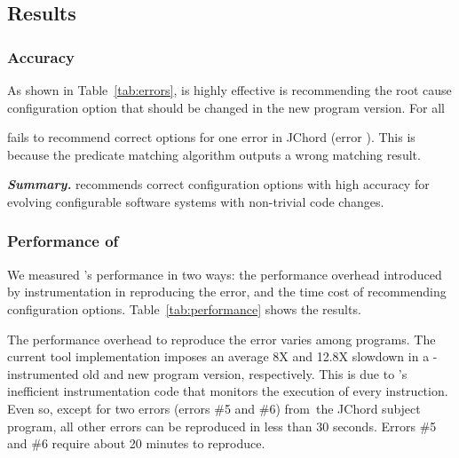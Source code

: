 \subsection{Results}

\subsubsection{Accuracy}
\label{sec:accuracy}

As shown in Table~\ref{tab:errors}, \ourtool is highly effective
is recommending the root cause configuration option that should
be changed in the new program version. For all 


\ourtool fails to recommend correct options for one error in
JChord (error ). This is because the predicate matching
algorithm outputs a wrong matching result.


\vspace{1mm}

\noindent \textbf{\textit{Summary.}} \ourtool
recommends correct configuration options with
high accuracy for evolving configurable software systems
with non-trivial code changes.

\subsubsection{Performance of \ourtool}
\label{sec:timecost}

We measured \ourtool's performance in two ways:
the performance overhead introduced by instrumentation
in reproducing the error, and the time cost
of recommending configuration options.
Table~\ref{tab:performance} shows the results.

The performance overhead to reproduce the error
varies among programs. The current tool implementation
imposes an average 8X and 12.8X slowdown in a
\ourtool-instrumented old and new program version, respectively.
This is due to \ourtool's inefficient instrumentation code that
monitors the execution of every instruction.
Even so, except for two errors (errors \#5 and \#6) from\
the JChord subject program,  all other errors can
be reproduced in less than 30 seconds. Errors \#5 and \#6
require about 20 minutes to reproduce.



